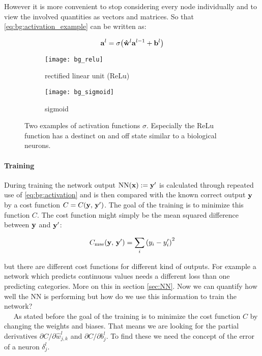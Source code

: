 \noindent
However it is more convenient to stop considering every node individually and to view the involved quantities as vectors and matrices. So that \eqref{eq:bg:activation_example} can be written as:

\begin{equation} \label{eq:bg:activation}
    \vb{a}^l = \sigma \qty(\vu{w}^l \vb{a}^{l-1} + \vb{b}^l)
\end{equation}

\begin{figure}[H]
\centering
\begin{subfigure}{.5\textwidth}
    \centering
    \texttt{[image: bg\_relu]}
    \caption{rectified linear unit (ReLu)}
    \label{}
\end{subfigure}%
\begin{subfigure}{.5\textwidth}
    \centering
    \texttt{[image: bg\_sigmoid]}
    \caption{sigmoid}
    \label{}
\end{subfigure}
\caption{Two examples of activation functions $\sigma$. Especially the ReLu function has a destinct on and off state similar to a biological neurons.}
\label{fig:al:act}
\end{figure}

\paragraph{Training} \label{par:training}
During training the network output $\mathrm{NN}(\vb x) := \vb{y}' $ is calculated through repeated use of \eqref{eq:bg:activation} and is then compared with the known correct output $\vb y$ by a cost function $C = C(\vb y, \, \vb y')$. The goal of the training is to minimize this function $C$. The cost function might simply be the mean squared difference between $\vb y$ and $\vb y'$:

\begin{equation}
    C_{\mathrm{mse}}(\vb y, \, \vb y') = \sum_i \qty(y_i - y_i')^2
\end{equation}

\noindent
but there are different cost functions for different kind of outputs. For example a network which predicts continuous values needs a different loss than one predicting categories. More on this in section \ref{sec:NN}. Now we can quantify how well the NN is performing but how do we use this information to train the network?
\\

$\quad$ As stated before the goal of the training is to minimize the cost function $C$ by changing the weights and biases. That means we are looking for the partial derivatives $\partial C / \partial \hat w^l_{j,k}$ and
$\partial C / \partial b^l_j$. To find these we need the concept of the error of a neuron $\delta^l_j$.

